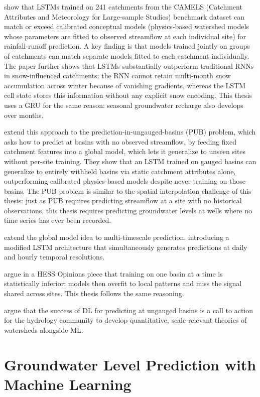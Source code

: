 \citet{kratzert2018rainfall} show
that LSTMs trained on 241 catchments from the CAMELS (Catchment Attributes and Meteorology for Large-sample Studies) benchmark dataset can match or
exceed calibrated conceptual models (physics-based watershed models whose parameters are
fitted to observed streamflow at each individual site) for rainfall-runoff prediction. A key finding is that models trained jointly on groups of catchments can match separate models fitted to each catchment individually. The paper further shows
that LSTMs substantially outperform traditional RNNs in snow-influenced catchments: the RNN
cannot retain multi-month snow accumulation across winter because of vanishing gradients,
whereas the LSTM cell state stores this information without any explicit snow encoding. This thesis uses a GRU for the same reason: seasonal groundwater recharge also develops over months.

\citet{kratzert2019toward} extend this approach to the prediction-in-ungauged-basins (PUB) problem, which asks how to predict at basins with no observed streamflow, by feeding fixed catchment features into a global model, which lets it generalize to unseen sites without per-site training. They show that an LSTM trained on gauged basins can generalize to entirely withheld basins via static catchment attributes alone, outperforming calibrated physics-based models despite never training on those basins. The PUB problem is similar to the spatial interpolation challenge of
this thesis: just as PUB requires predicting streamflow at a site with no historical
observations, this thesis requires predicting groundwater levels at wells where no time series
has ever been recorded.

\citet{gauch2021rainfall} extend the global model idea to multi-timescale prediction, introducing a modified LSTM architecture that simultaneously generates predictions at daily and hourly temporal resolutions.

\citet{kratzert2024never} argue in a HESS Opinions piece that training on one basin at a time is statistically inferior: models then overfit to local patterns and miss the signal shared across sites. This thesis follows the same reasoning.

\citet{nearing2021role} argue that the success of DL for predicting at ungauged basins is a call to action for the hydrology community to develop quantitative, scale-relevant theories of watersheds alongside ML.

\section{Groundwater Level Prediction with Machine Learning}
\label{sec:rw_gwl}

